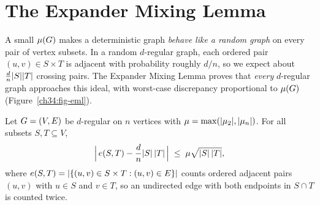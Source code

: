 \section{The Expander Mixing Lemma}
\label{ch34:eml}

A small $\mu(G)$ makes a deterministic graph \emph{behave like a random graph} on every pair of vertex subsets. In a random $d$-regular graph, each ordered pair $(u,v)\in S\times T$ is adjacent with probability roughly $d/n$, so we expect about $\frac{d}{n}\lvert S\rvert\lvert T\rvert$ crossing pairs. The Expander Mixing Lemma proves that \emph{every} $d$-regular graph approaches this ideal, with worst-case discrepancy proportional to $\mu(G)$ (Figure~\ref{ch34:fig-eml}).

\begin{theorem}
\label{ch34:thm-eml}
Let $G=(V,E)$ be $d$-regular on $n$ vertices with $\mu=\max(\lvert\mu_2\rvert,\lvert\mu_n\rvert)$. For all subsets $S,T\subseteq V$,
\[
  \Bigl\lvert\,e(S,T)-\frac{d}{n}\lvert S\rvert\,\lvert T\rvert\,\Bigr\rvert\;\le\;\mu\sqrt{\lvert S\rvert\,\lvert T\rvert},
\]
where $e(S,T)=\lvert\{(u,v)\in S\times T:(u,v)\in E\}\rvert$ counts ordered adjacent pairs $(u,v)$ with $u\in S$ and $v\in T$, so an undirected edge with both endpoints in $S\cap T$ is counted twice.
\end{theorem}

